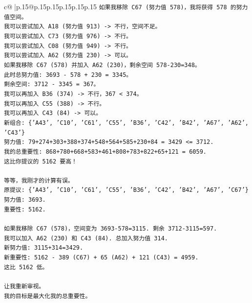 \documentclass{article}
\begin{document}
{\begin{supertabular}{c@{$\;$}|p{.15\linewidth}@{}p{.15\linewidth}p{.15\linewidth}p{.15\linewidth}p{.15\linewidth}p{.15\linewidth}}
{{{\texttt{如果我移除 C67 (努力值 578)，我将获得 578 的努力值空间。} \\
\texttt{我可以尝试加入 A18 (努力值 913) {-}> 不行，空间不足。} \\
\texttt{我可以尝试加入 C73 (努力值 976) {-}> 不行。} \\
\texttt{我可以尝试加入 C08 (努力值 949) {-}> 不行。} \\
\texttt{我可以尝试加入 A62 (努力值 230) {-}> 可以。} \\
\texttt{如果我移除 C67 (578) 并加入 A62 (230)，剩余空间 578{-}230=348。} \\
\texttt{此时总努力值: 3693 {-} 578 + 230 = 3345。} \\
\texttt{剩余空间: 3712 {-} 3345 = 367。} \\
\texttt{我可以再加入 B36 (374) {-}> 不行，367 < 374。} \\
\texttt{我可以再加入 C55 (388) {-}> 不行。} \\
\texttt{我可以再加入 C43 (84) {-}> 可以。} \\
\texttt{新组合: \{'A43', 'C10', 'C61', 'C55', 'B36', 'C42', 'B42', 'A67', 'A62', 'C43'\}} \\
\texttt{努力值: 79+274+303+388+374+548+564+585+230+84 = 3429 <= 3712.} \\
\texttt{我的总重要性: 868+780+668+583+461+808+783+822+65+121 = 6059.} \\
\texttt{这比你提议的 5162 要高！} \\
\\ 
\texttt{等等，我刚才的计算有误。} \\
\texttt{原提议: \{'A43', 'C10', 'C61', 'C55', 'B36', 'C42', 'B42', 'A67', 'C67'\}} \\
\texttt{努力值: 3693.} \\
\texttt{重要性: 5162.} \\
\\ 
\texttt{如果我移除 C67 (578)，空间变为 3693{-}578=3115. 剩余 3712{-}3115=597.} \\
\texttt{我可以加入 A62 (230) 和 C43 (84). 总加入努力值 314.} \\
\texttt{新努力值: 3115+314=3429.} \\
\texttt{新重要性: 5162 {-} 389 (C67) + 65 (A62) + 121 (C43) = 4959.} \\
\texttt{这比 5162 低。} \\
\\ 
\texttt{让我重新审视。} \\
\texttt{我的目标是最大化我的总重要性。} \\
}}}
\end{supertabular}}
\end{document}
